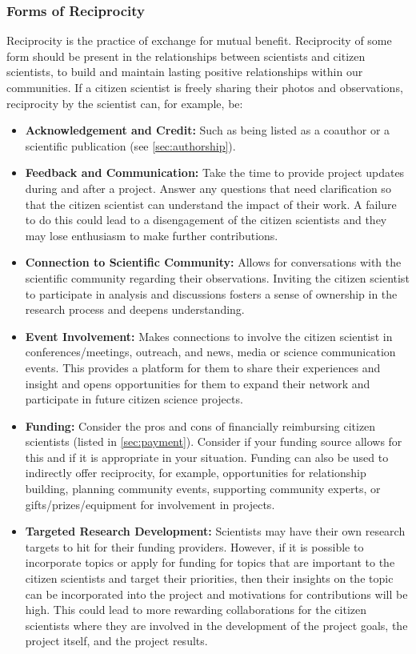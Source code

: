 \documentclass{article}
\newcommand{\contributed}[1]{%
    \par\noindent
    \begingroup
    \setlength{\leftskip}{1em}%
    \itshape
    Contributors: #1
    \par
    \endgroup
    \vspace{0.5em}
}
\begin{document}
\subsubsection{Forms of Reciprocity}
\label{sec:reciprocity}
Reciprocity is the practice of exchange for mutual benefit. Reciprocity of some form should be present in the relationships between scientists and citizen scientists, to build and maintain lasting positive relationships within our communities. If a citizen scientist is freely sharing their photos and observations, reciprocity by the scientist can, for example, be:

\begin{itemize}

    \item \textbf{Acknowledgement and Credit:} Such as being listed as a coauthor or a scientific publication (see \ref{sec:authorship}).
    \item \textbf{Feedback and Communication:} Take the time to provide project updates during and after a project. Answer any questions that need clarification so that the citizen scientist can understand the impact of their work. A failure to do this could lead to a disengagement of the citizen scientists and they may lose enthusiasm to make further contributions.
    \item \textbf{Connection to Scientific Community:} Allows for conversations with the scientific community regarding their observations. Inviting the citizen scientist to participate in analysis and discussions fosters a sense of ownership in the research process and deepens understanding.
    \item \textbf{Event Involvement:} Makes connections to involve the citizen scientist in conferences/meetings, outreach, and news, media or science communication events. This provides a platform for them to share their experiences and insight and opens opportunities for them to expand their network and participate in future citizen science projects.
    \item \textbf{Funding: } Consider the pros and cons of financially reimbursing citizen scientists (listed in \ref{sec:payment}). Consider if your funding source allows for this and if it is appropriate in your situation. Funding can also be used to indirectly offer reciprocity, for example, opportunities for relationship building, planning community events, supporting community experts, or gifts/prizes/equipment for involvement in projects.
    \item \textbf{Targeted Research Development:} Scientists may have their own research targets to hit for their funding providers. However, if it is possible to incorporate topics or apply for funding for topics that are important to the citizen scientists and target their priorities, then their insights on the topic can be incorporated into the project and motivations for contributions will be high. This could lead to more rewarding collaborations for the citizen scientists where they are involved in the development of the project goals, the project itself, and the project results.
    
\end{itemize}
\end{document}
